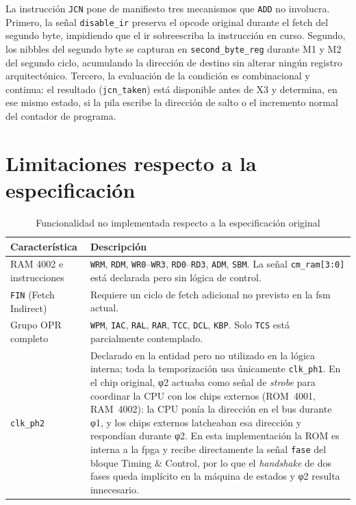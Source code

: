 \documentclass[%
    school=etsisi,%
    type=pfg,%
    degree=61CI,%
]{upm-report}
\begin{document}
La instrucción \texttt{JCN} pone de manifiesto tres mecanismos que
\texttt{ADD} no involucra.  Primero, la señal \texttt{disable\_ir}
preserva el opcode original durante el fetch del segundo byte,
impidiendo que el \acrshort{ir} sobreescriba la instrucción en curso.
Segundo, los nibbles del segundo byte se capturan en
\texttt{second\_byte\_reg} durante M1 y M2 del segundo ciclo,
acumulando la dirección de destino sin alterar ningún registro
arquitectónico.  Tercero, la evaluación de la condición es
combinacional y continua: el resultado (\texttt{jcn\_taken}) está
disponible antes de X3 y determina, en ese mismo estado, si la pila
escribe la dirección de salto o el incremento normal del contador de
programa.

\section{Limitaciones respecto a la especificación}
\label{s:limitaciones}

\begin{table}[H]
\centering
\caption{Funcionalidad no implementada respecto a la especificación original}
\label{tab:limitaciones}
\begin{tabularx}{\textwidth}{@{}lX@{}}
\toprule
\textbf{Característica} & \textbf{Descripción} \\
\midrule
RAM 4002 e instrucciones & \texttt{WRM}, \texttt{RDM}, \texttt{WR0}--\texttt{WR3},
    \texttt{RD0}--\texttt{RD3}, \texttt{ADM}, \texttt{SBM}.  La señal
    \texttt{cm\_ram[3:0]} está declarada pero sin lógica de control. \\
\addlinespace
\texttt{FIN} (Fetch Indirect) & Requiere un ciclo de fetch adicional no previsto
    en la \acrshort{fsm} actual. \\
\addlinespace
Grupo OPR completo & \texttt{WPM}, \texttt{IAC}, \texttt{RAL}, \texttt{RAR},
    \texttt{TCC}, \texttt{DCL}, \texttt{KBP}.  Solo \texttt{TCS} está
    parcialmente contemplado. \\
\addlinespace
\texttt{clk\_ph2} & Declarado en la entidad pero no utilizado en la lógica
    interna; toda la temporización usa únicamente \texttt{clk\_ph1}.
    En el chip original, φ2 actuaba como señal de \textit{strobe} para
    coordinar la CPU con los chips externos (ROM~4001, RAM~4002): la CPU
    ponía la dirección en el bus durante φ1, y los chips externos
    latcheaban esa dirección y respondían durante φ2.  En esta
    implementación la ROM es interna a la \acrshort{fpga} y recibe
    directamente la señal \texttt{fase} del bloque Timing \& Control,
    por lo que el \textit{handshake} de dos fases queda implícito en la
    máquina de estados y φ2 resulta innecesario. \\
\bottomrule
\end{tabularx}
\end{table}
\end{document}
